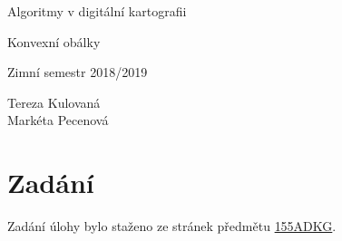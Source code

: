 \documentclass[a4paper, 12pt]{article}
\begin{document}
\begin{titlepage}
\begin{center}
\Huge
\vspace*{4.5cm}
Algoritmy v digitální kartografii \\
\vspace{0.2cm}

\Large  
Konvexní obálky\\
\vspace{0.2cm}

\normalsize  
Zimní semestr 2018/2019\\
\vspace{14cm}
\end{center}

\begin{flushright}
\Large
Tereza Kulovaná \\
Markéta Pecenová \\
\end{flushright}

\end{titlepage}


\pagestyle{plain}     %
\setcounter{page}{1}  %

\tableofcontents
\newpage

\section{Zadání}
Zadání úlohy bylo staženo ze stránek předmětu \href{https://web.natur.cuni.cz/~bayertom/index.php/teaching/algoritmy-v-digitalni-kartografii}{155ADKG}.
\end{document}

